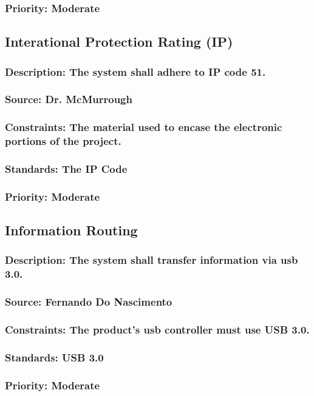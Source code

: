 \subsubsection{Priority: Moderate}

\subsection{Interational Protection Rating (IP)}
\subsubsection{Description: The system shall adhere to IP code 51.}
\subsubsection{Source: Dr. McMurrough}
\subsubsection{Constraints: The material used to encase the electronic portions of the project.}
\subsubsection{Standards: The IP Code}
\subsubsection{Priority: Moderate}

\subsection{Information Routing}
\subsubsection{Description: The system shall transfer information via usb 3.0.}
\subsubsection{Source: Fernando Do Nascimento}
\subsubsection{Constraints: The product's usb controller must use USB 3.0.}
\subsubsection{Standards: USB 3.0}
\subsubsection{Priority: Moderate}
